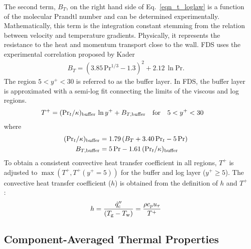 The second term, $B_T$, on the right hand side of Eq.~\ref{eqn_t_loglaw} is a function of the molecular Prandtl number and can be determined experimentally. Mathematically, this term is the integration constant stemming from the relation between velocity and temperature gradients. Physically, it represents the resistance to the heat and momentum transport close to the wall. FDS uses the experimental correlation proposed by Kader~\cite{Kader:1981}
\begin{align}
\label{eqn_t_bt}
B_T =(3.85 \,\mbox{Pr}^{1/3}-1.3)^2 + 2.12 \,\ln\mbox{Pr}.
\end{align}
The region $5 < y^+ < 30$ is referred to as the buffer layer.  In FDS, the buffer layer is approximated with a semi-log fit connecting the limits of the viscous and log regions.
\begin{align}
\label{eqn_t_buffer_layer}
T^+ &= (\mbox{Pr}_t /\kappa)_{\rm buffer} \,\ln y^+ + B_{T,{\rm buffer}}  && \mbox{for} \quad 5 < y^+ < 30
\end{align}
where
\begin{align}
(\mbox{Pr}_t /\kappa)_{\rm buffer} &= 1.79\,(B_T + 3.40 \,\mbox{Pr}_t - 5 \,\mbox{Pr}) \\
B_{T,{\rm buffer}} &= 5 \,\mbox{Pr} - 1.61 \,(\mbox{Pr}_t /\kappa)_{\rm buffer}
\end{align}
To obtain a consistent convective heat transfer coefficient in all regions, $T^+$ is adjusted to $\max(T^+,T^+ (y^+ = 5))$ for the buffer and log layer ($y^+ \ge 5$). The convective heat transfer coefficient ($h$) is obtained from the definition of $h$ and $T^+$:
\begin{align}
\label{eqn_h_model}
h = \frac{\dot{q}_{\rm c}''}{(T_{\rm g} - T_{\rm w})}= \frac{{\rho}{c_p}{u_{\tau}}}{T^+}
\end{align}



\subsection{Component-Averaged Thermal Properties}
\label{matcoefs}

